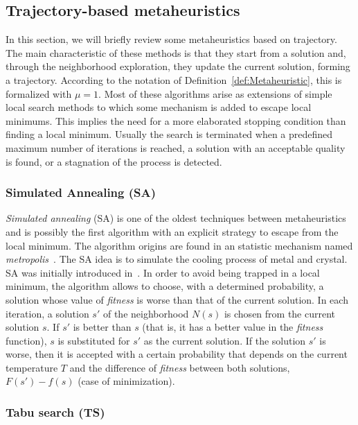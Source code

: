 \subsection{Trajectory-based metaheuristics}
\label{sec:TrajectoryBasedMetaheuristics}

In this section, we will briefly review some metaheuristics based on trajectory. The main characteristic of these methods is that they start from a solution and, through the neighborhood exploration, they update the current solution, forming a trajectory. According to the notation of Definition~\ref {def:Metaheuristic}, this is formalized with $\mu = 1$. Most of these algorithms arise as extensions of simple local search methods to which some mechanism is added to escape local minimums. This implies the need for a more elaborated stopping condition than finding a local minimum. Usually the search is terminated when a predefined maximum number of iterations is reached, a solution with an acceptable quality is found, or a stagnation of the process is detected.

\subsubsection{Simulated Annealing (SA)}

\emph{Simulated annealing} (SA) is one of the oldest techniques between metaheuristics and is possibly the first algorithm with an explicit strategy to escape from the local minimum. The algorithm origins are found in an statistic mechanism named \emph{metropolis}~\cite{metropolis53equation}. The SA idea is to simulate the cooling process of metal and crystal. SA was initially introduced in~\cite{kirkpatrick83optimization}. In order to avoid being trapped in a local minimum, the algorithm allows to choose, with  a determined probability, a solution whose value of \emph{fitness} is worse than that of the current solution. In each iteration, a solution $s'$ of the neighborhood $N(s)$ is chosen from the current solution $s$. If $s'$ is better than $s$ (that is, it has a better value in the \emph{fitness} function), $s$ is substituted for $s'$ as the current solution. If the solution $s'$ is worse, then it is accepted with a certain probability that depends on the current temperature $T$ and the difference of \emph{fitness} between both solutions,
$F(s') - f(s)$ (case of minimization). 

\subsubsection{Tabu search (TS)}

